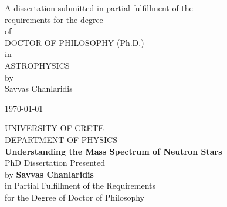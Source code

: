 \documentclass[a4paper, 10pt, twoside]{book}
\begin{document}
\begin{titlepage}
\begin{center}
            \normalsize
            A dissertation submitted in partial fulfillment of the \\
            \vspace{0.5cm} 
            requirements for the degree \\
            \vspace{0.5cm}
            of \\
            \vspace{0.5cm}
            DOCTOR OF PHILOSOPHY (Ph.D.) \\
            \vspace{0.5cm}
            in \\
            \vspace{0.5cm}
            ASTROPHYSICS \\
            \vspace{0.5cm}
            by \\
            \vspace{0.5cm}
            Savvas Chanlaridis \\
            \vspace{4cm}
            \date{}{\today}
        \end{center}
    \end{titlepage}

    \newpage  %
    \mbox{}
    \thispagestyle{empty}
    
    \newpage
    \thispagestyle{empty}
    \begin{center}
        UNIVERSITY OF CRETE \\
        \vspace{0.25cm}
        DEPARTMENT OF PHYSICS \\
        \vspace{0.5cm}
        \textbf{Understanding the Mass Spectrum of Neutron Stars} \\
        \vspace{0.5cm}
        PhD Dissertation Presented \\
        \vspace{0.5cm}
        by \textbf{Savvas Chanlaridis} \\
        \vspace{0.5cm}
        in Partial Fulfillment of the Requirements \\
        \vspace{0.5cm}
        for the Degree of Doctor of Philosophy
    \end{center}
     \vspace{0.8cm}
     
\end{document}
